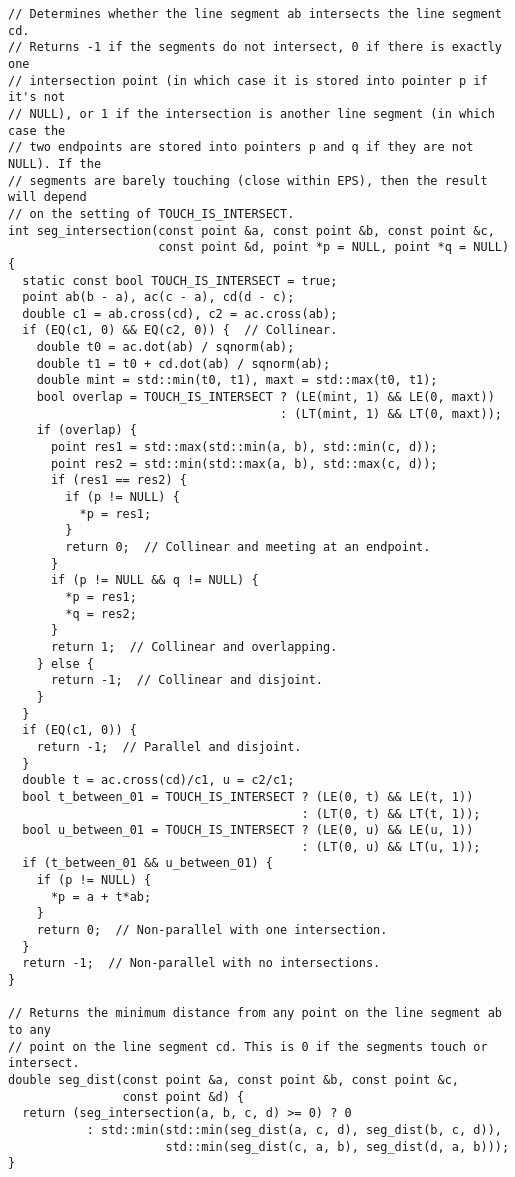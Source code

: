 \begin{lstlisting}
// Determines whether the line segment ab intersects the line segment cd.
// Returns -1 if the segments do not intersect, 0 if there is exactly one
// intersection point (in which case it is stored into pointer p if it's not
// NULL), or 1 if the intersection is another line segment (in which case the
// two endpoints are stored into pointers p and q if they are not NULL). If the
// segments are barely touching (close within EPS), then the result will depend
// on the setting of TOUCH_IS_INTERSECT.
int seg_intersection(const point &a, const point &b, const point &c,
                     const point &d, point *p = NULL, point *q = NULL) {
  static const bool TOUCH_IS_INTERSECT = true;
  point ab(b - a), ac(c - a), cd(d - c);
  double c1 = ab.cross(cd), c2 = ac.cross(ab);
  if (EQ(c1, 0) && EQ(c2, 0)) {  // Collinear.
    double t0 = ac.dot(ab) / sqnorm(ab);
    double t1 = t0 + cd.dot(ab) / sqnorm(ab);
    double mint = std::min(t0, t1), maxt = std::max(t0, t1);
    bool overlap = TOUCH_IS_INTERSECT ? (LE(mint, 1) && LE(0, maxt))
                                      : (LT(mint, 1) && LT(0, maxt));
    if (overlap) {
      point res1 = std::max(std::min(a, b), std::min(c, d));
      point res2 = std::min(std::max(a, b), std::max(c, d));
      if (res1 == res2) {
        if (p != NULL) {
          *p = res1;
        }
        return 0;  // Collinear and meeting at an endpoint.
      }
      if (p != NULL && q != NULL) {
        *p = res1;
        *q = res2;
      }
      return 1;  // Collinear and overlapping.
    } else {
      return -1;  // Collinear and disjoint.
    }
  }
  if (EQ(c1, 0)) {
    return -1;  // Parallel and disjoint.
  }
  double t = ac.cross(cd)/c1, u = c2/c1;
  bool t_between_01 = TOUCH_IS_INTERSECT ? (LE(0, t) && LE(t, 1))
                                         : (LT(0, t) && LT(t, 1));
  bool u_between_01 = TOUCH_IS_INTERSECT ? (LE(0, u) && LE(u, 1))
                                         : (LT(0, u) && LT(u, 1));
  if (t_between_01 && u_between_01) {
    if (p != NULL) {
      *p = a + t*ab;
    }
    return 0;  // Non-parallel with one intersection.
  }
  return -1;  // Non-parallel with no intersections.
}

// Returns the minimum distance from any point on the line segment ab to any
// point on the line segment cd. This is 0 if the segments touch or intersect.
double seg_dist(const point &a, const point &b, const point &c,
                const point &d) {
  return (seg_intersection(a, b, c, d) >= 0) ? 0
           : std::min(std::min(seg_dist(a, c, d), seg_dist(b, c, d)),
                      std::min(seg_dist(c, a, b), seg_dist(d, a, b)));
}


\end{lstlisting}
